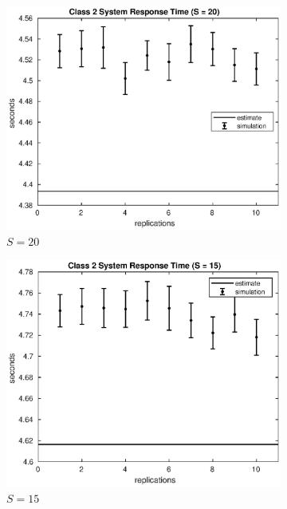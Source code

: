 \begin{figure}[!h]
\centering
%
\begin{subfigure}[t]{0.49\textwidth}
\includegraphics[width=\textwidth]{figures/simul/20_500K_s2}
\caption{$S = 20$}
\label{20_s2}
\end{subfigure}
%
\begin{subfigure}[t]{0.49\textwidth}
\includegraphics[width=\textwidth]{figures/simul/15_500K_s2}
\caption{$S = 15$}
\label{15_s2}
\end{subfigure}
%
\begin{subfigure}[t]{0.49\textwidth}

\end{subfigure}
\end{figure}
